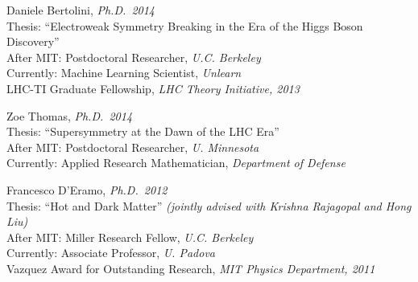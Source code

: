 \item Daniele Bertolini, \emph{Ph.D.~2014}
\\ Thesis: ``Electroweak Symmetry Breaking in the Era of the Higgs Boson Discovery''
\\ After MIT: Postdoctoral Researcher, \emph{U.C. Berkeley}
\\ Currently: Machine Learning Scientist, \emph{Unlearn}
\\ LHC-TI Graduate Fellowship, \emph{LHC Theory Initiative, 2013}

\item Zoe Thomas, \emph{Ph.D.~2014}
\\ Thesis: ``Supersymmetry at the Dawn of the LHC Era''
\\ After MIT: Postdoctoral Researcher, \emph{U. Minnesota}
\\ Currently: Applied Research Mathematician, \emph{Department of Defense}

\item Francesco D'Eramo, \emph{Ph.D.~2012}
\\ Thesis: ``Hot and Dark Matter'' \emph{(jointly advised with Krishna Rajagopal and Hong Liu)}
\\ After MIT: Miller Research Fellow, \emph{U.C. Berkeley}
\\ Currently: Associate Professor, \emph{U. Padova}
\\ Vazquez Award for Outstanding Research, \emph{MIT Physics Department, 2011}

\el
